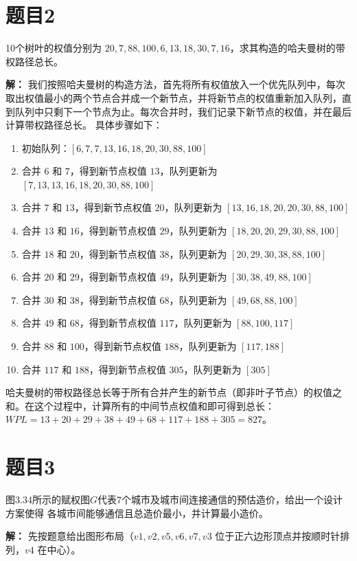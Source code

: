 \documentclass[utf8]{ctexart}
\theoremstyle{mystyle}
\begin{document}
\section*{题目2}
\begin{problembox}
10个树叶的权值分别为 $20, 7, 88, 100, 6, 13, 18, 30, 7, 16$，求其构造的哈夫曼树的带权路径总长。
\end{problembox}
\textbf{解：} 我们按照哈夫曼树的构造方法，首先将所有权值放入一个优先队列中，每次取出权值最小的两个节点合并成一个新节点，并将新节点的权值重新加入队列，直到队列中只剩下一个节点为止。每次合并时，我们记录下新节点的权值，并在最后计算带权路径总长。
具体步骤如下：
\begin{enumerate}
    \item 初始队列：$[6, 7, 7, 13, 16, 18, 20, 30, 88, 100]$
    \item 合并 $6$ 和 $7$，得到新节点权值 $13$，队列更新为 $[7, 13, 13, 16, 18, 20, 30, 88, 100]$
    \item 合并 $7$ 和 $13$，得到新节点权值 $20$，队列更新为 $[13, 16, 18, 20, 20, 30, 88, 100]$
    \item 合并 $13$ 和 $16$，得到新节点权值 $29$，队列更新为 $[18, 20, 20, 29, 30, 88, 100]$
    \item 合并 $18$ 和 $20$，得到新节点权值 $38$，队列更新为 $[20, 29, 30, 38, 88, 100]$
    \item 合并 $20$ 和 $29$，得到新节点权值 $49$，队列更新为 $[30, 38, 49, 88, 100]$
    \item 合并 $30$ 和 $38$，得到新节点权值 $68$，队列更新为 $[49, 68, 88, 100]$
    \item 合并 $49$ 和 $68$，得到新节点权值 $117$，队列更新为 $[88, 100, 117]$
    \item 合并 $88$ 和 $100$，得到新节点权值 $188$，队列更新为 $[117, 188]$
    \item 合并 $117$ 和 $188$，得到新节点权值 $305$，队列更新为 $[305]$
\end{enumerate}
哈夫曼树的带权路径总长等于所有合并产生的新节点（即非叶子节点）的权值之和。在这个过程中，计算所有的中间节点权值和即可得到总长：
$WPL = 13 + 20 + 29 + 38 + 49 + 68 + 117 + 188 + 305 = 827$。

\newpage
\section*{题目3}
\begin{problembox}
图3.34所示的赋权图$G$代表7个城市及城市间连接通信的预估造价，给出一个设计方案使得
各城市间能够通信且总造价最小，并计算最小造价。
\end{problembox}
\textbf{解：} 先按题意给出图形布局（$v1,v2,v5,v6,v7,v3$ 位于正六边形顶点并按顺时针排列，$v4$ 在中心）。
\end{document}
